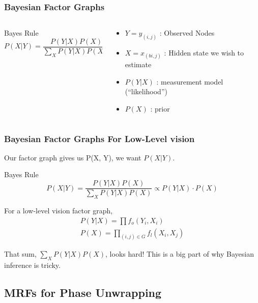 \documentclass[compress]{beamer}
\begin{document}
\begin{frame}
\frametitle{Bayesian Factor Graphs}
\begin {columns}
  \begin{column}{5cm}
    \begin{block}{Bayes Rule} 
      \begin{equation*}
        P(X | Y ) = \frac{P(Y | X) P(X)}{\sum_XP(Y|X)P(X)}
      \end{equation*}
    \end{block}
  \end{column}
  \begin{column}{5cm}
    \begin{itemize}
    \item $Y = {y_{(i, j)}}$ : Observed Nodes
    \item $X = {x_{(bi, j)}}$ : Hidden state we wish to estimate
    \item $P(Y | X) $ : measurement model (``likelihood'')
    \item $P(X) $ : prior 

    \end{itemize}
  \end{column}
  
  \end{columns}
\end{frame}

\begin{frame}
\frametitle{Bayesian Factor Graphs For Low-Level vision}
Our factor graph gives us P(X, Y), we want $P(X | Y)$. 

\begin{block}{Bayes Rule} 
  \begin{equation*}
    P(X | Y ) = \frac{P(Y | X) P(X)}{\sum_XP(Y|X)P(X)} \propto P(Y | X) \cdot  P(X)
  \end{equation*}
\end{block}

For a low-level vision factor graph,
\begin{eqnarray*}
  P(Y | X) =  \prod f_o(Y_i,  X_i) \\
  P(X) = \prod_{(i, j) \in G} f_l(X_i, X_j)
\end{eqnarray*}

That sum, $\sum_XP(Y|X)P(X)$, looks hard! This is a big part of why 
Bayesian inference is tricky. 

\end{frame}

\subsection{MRFs for Phase Unwrapping}
\end{document}
